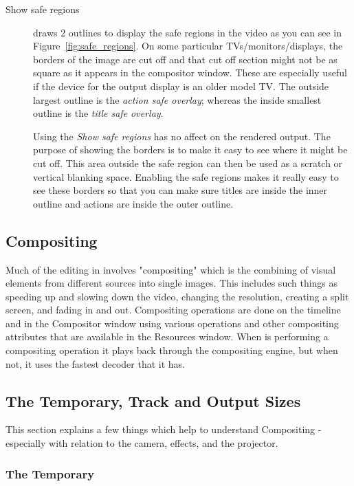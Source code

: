 \begin{description}
    \item[Show safe regions]  draws 2 outlines to display the safe regions in the video as you
can see in Figure~\ref{fig:safe_regions}.
On some particular TVs/monitors/displays, the borders of the image are cut off and that
cut off section might not be as square as it appears in the compositor window. 
These are especially useful if the device for the output display is an older model TV\@.
The outside largest outline is the \textit{action safe overlay}; whereas the inside smallest
outline is the \textit{title safe overlay}.

Using the \textit{Show safe regions} has no affect on the rendered output.
The purpose of showing the borders is to make it easy to see where it might be cut off.  This
area outside the safe region can then be used as
a scratch or vertical blanking space.  Enabling the safe regions makes it really
easy to see these borders so that you can make sure 
titles are inside the inner outline and actions are inside the outer outline.

\end{description}

\subsection{Compositing}%
\label{sub:compositing}

Much of the editing in \CGG{} involves "compositing" which is the combining of visual
elements from different sources into single images.  This includes such things as 
speeding up and slowing down the video, changing the resolution, creating a split screen, and fading in and out.
Compositing operations are done on the timeline and in the Compositor window using various
operations and other compositing attributes that are available in the Resources window.
When \CGG{} is performing a compositing operation it plays back through the
compositing engine, but when not, it uses the fastest decoder that it has.

\subsection{The Temporary, Track and Output Sizes}%
\label{sub:track_and_output_sizes}

This section explains a few things which help to understand Compositing - especially with relation
to the camera, effects, and the projector.

\subsubsection*{The Temporary}%
\label{ssub:output_size}

